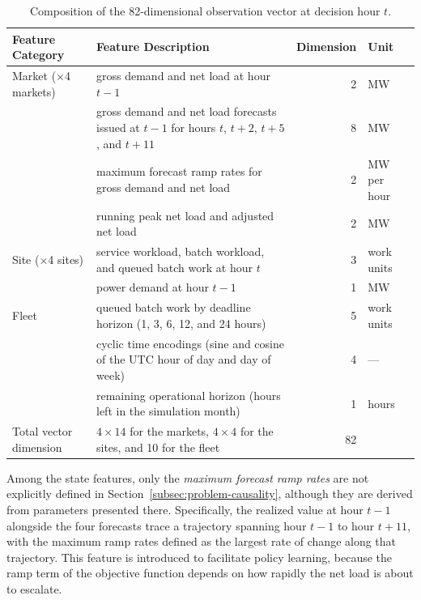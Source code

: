 \documentclass{UNCC-thesis}
\begin{document}
\begin{table}[htbp]
  \centering
  \footnotesize
  \caption[Composition of the observation vector]{Composition of the 82-dimensional
  observation vector at decision hour \(t\).}
  \label{tab:observation}
  \begin{tabular}{@{}L{0.16\textwidth}L{0.48\textwidth}rL{0.15\textwidth}@{}}
    \toprule
    Feature Category & Feature Description & Dimension & Unit \\
    \midrule
    Market (\(\times\)4 markets)
      & gross demand and net load at hour \(t-1\) & 2 & MW \\
      & gross demand and net load forecasts issued at \(t-1\) for hours
        \(t\), \(t+2\), \(t+5\), and \(t+11\) & 8 & MW \\
      & maximum forecast ramp rates for gross demand and net load & 2
      & MW per hour \\
      & running peak net load and adjusted net load & 2 & MW \\
    \addlinespace
    Site (\(\times\)4 sites)
      & service workload, batch workload, and queued batch work at hour \(t\) & 3
      & work units \\
      & power demand at hour \(t-1\) & 1 & MW \\
    \addlinespace
    Fleet
      & queued batch work by deadline horizon (1, 3, 6, 12, and 24 hours) & 5
      & work units \\
      & cyclic time encodings (sine and cosine of the UTC hour of day and day of week) & 4
      & --- \\
      & remaining operational horizon (hours left in the simulation month) & 1 & hours \\
    \midrule
    Total vector dimension & \(4\times14\) for the markets, \(4\times4\) for the sites, and 10
      for the fleet & 82 & \\
    \bottomrule
  \end{tabular}
\end{table}

Among the state features, only the \emph{maximum forecast ramp rates} are not explicitly
defined in Section~\ref{subsec:problem-causality}, although they are derived from parameters
presented there. Specifically, the realized value at hour \(t-1\) alongside the four forecasts
trace a trajectory spanning hour \(t-1\) to hour \(t+11\), with the maximum ramp rates defined
as the largest rate of change along that trajectory. This feature is introduced to facilitate
policy learning, because the ramp term of the objective function depends on how rapidly the
net load is about to escalate.
\end{document}
